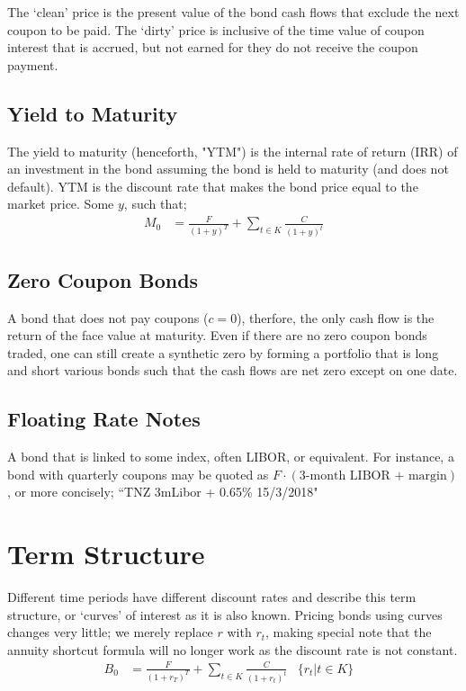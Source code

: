\documentclass[a4paper]{article}
\begin{document}
The `clean' price is the present value of the bond cash flows that exclude the
next coupon to be paid. The `dirty' price is inclusive of the time value of
coupon interest that is accrued, but not earned for they do not receive
the coupon payment.

\subsection{Yield to Maturity}
The yield to maturity
(henceforth, "YTM") is the internal rate of return (IRR) of an investment
in the bond assuming the bond is held to maturity (and does not default).
YTM is the discount rate that makes the bond price equal to the market price.
Some $y$, such that;
\begin{align*}
M_0 &= \frac{F}{(1 + y)^T} + \sum_{t \in K} \frac{C}{(1 + y)^t}
\end{align*}

\subsection{Zero Coupon Bonds}
A bond that does not pay coupons ($c = 0$),
therfore, the only cash flow is the return
of the face value at maturity. Even if there are no zero coupon bonds traded,
one can still create a synthetic zero by forming a portfolio that is long
and short various bonds such that the cash flows are net zero except on one
date.

\subsection{Floating Rate Notes}
A bond that is linked to some index, often LIBOR, or equivalent. For instance,
a bond with quarterly coupons may be quoted as $F \cdot (\text{3-month LIBOR
+ margin})$, or more concisely; ``TNZ 3mLibor + 0.65\% 15/3/2018"


\section{Term Structure}
Different time periods have different discount rates and describe this term
structure, or `curves' of interest as it is also known. Pricing bonds
using curves changes very little; we merely replace $r$ with $r_t$, making
special note that the annuity shortcut formula will no longer work as the
discount rate is not constant.
\begin{align*}
B_0 &= \frac{F}{(1 + r_T)^T} + \sum_{t \in K} \frac{C}{(1 + r_t)^t} &
\{r_t | t \in K\} &
\end{align*}
\end{document}
